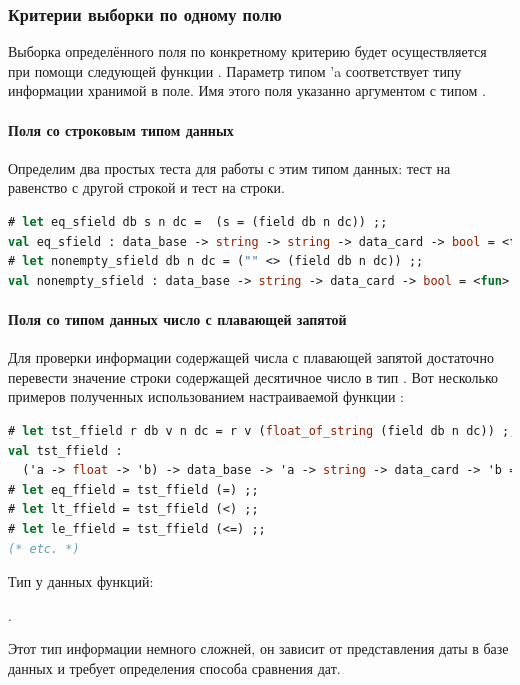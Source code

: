 \subsubsection{Критерии выборки по одному полю}

Выборка определённого поля по конкретному критерию будет осуществляется при 
помощи следующей функции . Параметр типом 'a соответствует типу информации хранимой в поле. Имя 
этого поля указанно аргументом с типом .

\paragraph{Поля со строковым типом данных}

Определим два простых теста для работы с этим типом данных: тест на равенство с 
другой строкой и тест на  строки.

\begin{lstlisting}[language=OCaml]
# let eq_sfield db s n dc =  (s = (field db n dc)) ;;
val eq_sfield : data_base -> string -> string -> data_card -> bool = <fun>
# let nonempty_sfield db n dc = ("" <> (field db n dc)) ;;
val nonempty_sfield : data_base -> string -> data_card -> bool = <fun>
\end{lstlisting}

\paragraph{Поля со типом данных число с плавающей запятой}

Для проверки информации содержащей числа с плавающей запятой достаточно 
перевести значение строки содержащей десятичное число в тип . Вот 
несколько примеров полученных использованием настраиваемой функции 
:

\begin{lstlisting}[language=OCaml]
# let tst_ffield r db v n dc = r v (float_of_string (field db n dc)) ;;
val tst_ffield :
  ('a -> float -> 'b) -> data_base -> 'a -> string -> data_card -> 'b = <fun>
# let eq_ffield = tst_ffield (=) ;;  
# let lt_ffield = tst_ffield (<) ;;  
# let le_ffield = tst_ffield (<=) ;; 
(* etc. *) 
\end{lstlisting}

Тип у данных функций:

.

Этот тип информации немного сложней, он зависит от представления даты в базе 
данных и требует определения способа сравнения дат.

